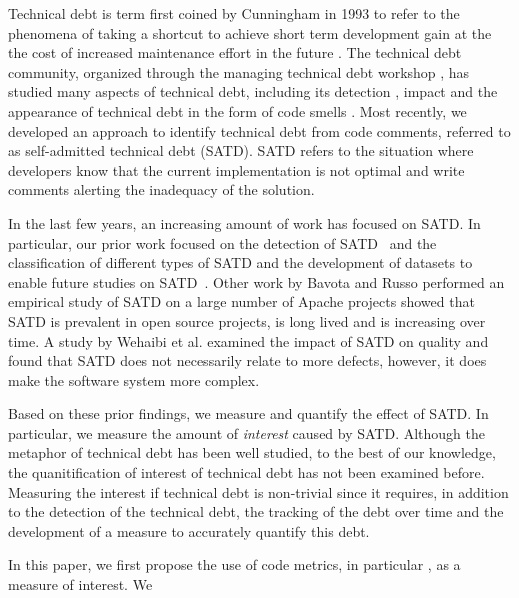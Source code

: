 Technical debt is term first coined by Cunningham in 1993 to refer to the phenomena of taking a shortcut to achieve short term development gain at the the cost of increased maintenance effort in the future \cite{Cunningham1992WPM}. The technical debt community, organized through the managing technical debt workshop \cite{Falessi2014MTD}, has studied many aspects of technical debt, including its detection \cite{Zazworka2013CSE}, impact \cite{Zazworka2011MTD}
and the appearance of technical debt in the form of code smells \cite{Fontana2012MTD}. Most recently, we developed an approach to identify technical debt from code comments, referred to as self-admitted technical debt (SATD). SATD refers to the situation where developers know that the current implementation is not optimal and write comments alerting the inadequacy of the solution.

In the last few years, an increasing amount of work has focused on SATD. In particular, our prior work focused on the detection of SATD~\cite{Potdar2014ICSME} and the classification of different types of SATD and the development of datasets to enable future studies on SATD~\cite{Maldonado2015MTD}. Other work by Bavota and Russo performed an empirical study of SATD on a large number of Apache projects showed that SATD is prevalent in open source projects, is long lived and is increasing over time. A study by Wehaibi et al.  examined the impact of SATD on quality and found that SATD does not necessarily relate to more defects, however, it does make the software system more complex. 

Based on these prior findings, we measure and quantify the effect of SATD. In particular, we measure the amount of \emph{interest} caused by SATD. Although the metaphor of technical debt has been well studied, to the best of our knowledge, the quanitification of interest of technical debt has not been examined before. Measuring the interest if technical debt is non-trivial since it requires, in addition to the detection of the technical debt, the tracking of the debt over time and the development of a measure to accurately quantify this debt.

In this paper, we first propose the use of code metrics, in particular , as a measure of interest. We 
 
